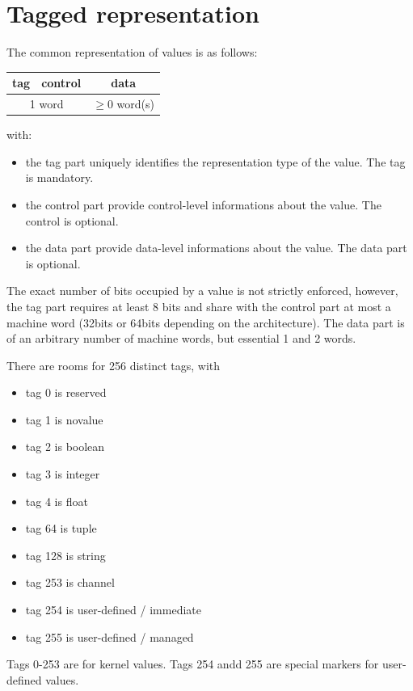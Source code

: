 \documentclass[a4paper,11pt]{article}
\newcommand{\code}[1]{\textsf{#1}}
\begin{document}
\section{Tagged representation}

The common representation of  values is as follows:

\begin{tabular}{|c|c|c|}
\hline
\code{tag} & \code{control} & \code{data} \\
\hline
\multicolumn{2}{|c|}{1 word} & $\geq 0$ word(s) \\
\hline
\end{tabular}

with:

\begin{itemize}
\item the tag part uniquely identifies the representation type of the value. The tag is mandatory.
\item the control part provide control-level informations about the value. The control is optional.
\item the data part provide data-level informations about the value. The data part is optional.
\end{itemize}

The exact number of bits occupied by a value is not strictly enforced, 
however, the tag part requires at least 8 bits and share with the control part at most a machine word (32bits or 64bits depending on the architecture).
The data part is of an arbitrary number of machine words, but essential 1 and 2 words.

There are rooms for 256 distinct tags, with
\begin{itemize}
\item tag 0 is reserved
\item tag 1 is novalue
\item tag 2 is boolean
\item tag 3 is integer
\item tag 4 is float
\item tag 64 is tuple
\item tag 128 is string
\item tag 253 is channel
\item tag 254 is user-defined / immediate
\item tag 255 is user-defined / managed
\end{itemize}

Tags 0-253 are for kernel values.
Tags 254 andd 255 are special markers for user-defined values.
\end{document}
